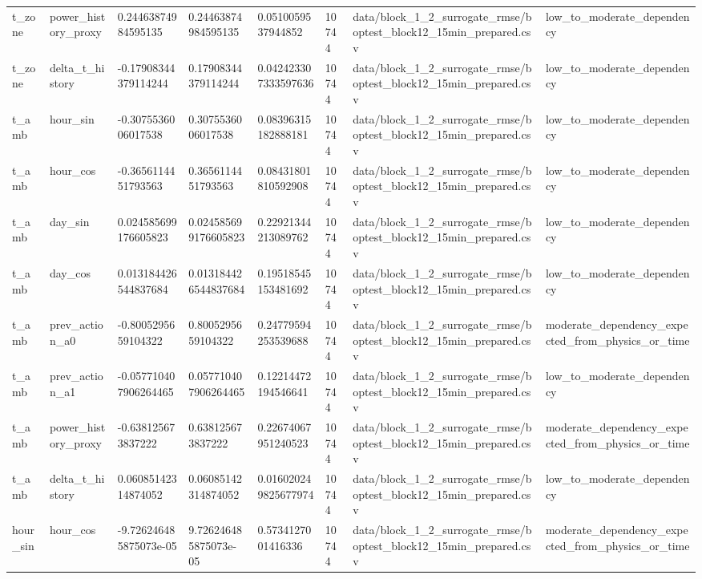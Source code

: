 \documentclass[11pt,a4paper]{article}
\begin{document}
\begin{small}
\begin{longtable}{L{2.06cm} L{2.06cm} L{2.06cm} L{2.06cm} L{2.06cm} L{2.06cm} L{2.06cm} L{2.06cm}}
t\_zone & power\_history\_proxy & 0.24463874984595135 & 0.24463874984595135 & 0.0510059537944852 & 10744 & data/block\_1\_2\_surrogate\_rmse/boptest\_block12\_15min\_prepared.csv & low\_to\_moderate\_dependency \\
t\_zone & delta\_t\_history & -0.17908344379114244 & 0.17908344379114244 & 0.042423307333597636 & 10744 & data/block\_1\_2\_surrogate\_rmse/boptest\_block12\_15min\_prepared.csv & low\_to\_moderate\_dependency \\
t\_amb & hour\_sin & -0.3075536006017538 & 0.3075536006017538 & 0.08396315182888181 & 10744 & data/block\_1\_2\_surrogate\_rmse/boptest\_block12\_15min\_prepared.csv & low\_to\_moderate\_dependency \\
t\_amb & hour\_cos & -0.3656114451793563 & 0.3656114451793563 & 0.08431801810592908 & 10744 & data/block\_1\_2\_surrogate\_rmse/boptest\_block12\_15min\_prepared.csv & low\_to\_moderate\_dependency \\
t\_amb & day\_sin & 0.024585699176605823 & 0.024585699176605823 & 0.22921344213089762 & 10744 & data/block\_1\_2\_surrogate\_rmse/boptest\_block12\_15min\_prepared.csv & low\_to\_moderate\_dependency \\
t\_amb & day\_cos & 0.013184426544837684 & 0.013184426544837684 & 0.19518545153481692 & 10744 & data/block\_1\_2\_surrogate\_rmse/boptest\_block12\_15min\_prepared.csv & low\_to\_moderate\_dependency \\
t\_amb & prev\_action\_a0 & -0.8005295659104322 & 0.8005295659104322 & 0.24779594253539688 & 10744 & data/block\_1\_2\_surrogate\_rmse/boptest\_block12\_15min\_prepared.csv & moderate\_dependency\_expected\_from\_physics\_or\_time \\
t\_amb & prev\_action\_a1 & -0.057710407906264465 & 0.057710407906264465 & 0.12214472194546641 & 10744 & data/block\_1\_2\_surrogate\_rmse/boptest\_block12\_15min\_prepared.csv & low\_to\_moderate\_dependency \\
t\_amb & power\_history\_proxy & -0.638125673837222 & 0.638125673837222 & 0.22674067951240523 & 10744 & data/block\_1\_2\_surrogate\_rmse/boptest\_block12\_15min\_prepared.csv & moderate\_dependency\_expected\_from\_physics\_or\_time \\
t\_amb & delta\_t\_history & 0.06085142314874052 & 0.06085142314874052 & 0.016020249825677974 & 10744 & data/block\_1\_2\_surrogate\_rmse/boptest\_block12\_15min\_prepared.csv & low\_to\_moderate\_dependency \\
hour\_sin & hour\_cos & -9.726246485875073e-05 & 9.726246485875073e-05 & 0.5734127001416336 & 10744 & data/block\_1\_2\_surrogate\_rmse/boptest\_block12\_15min\_prepared.csv & moderate\_dependency\_expected\_from\_physics\_or\_time \\

\end{longtable}
\end{small}
\end{document}
